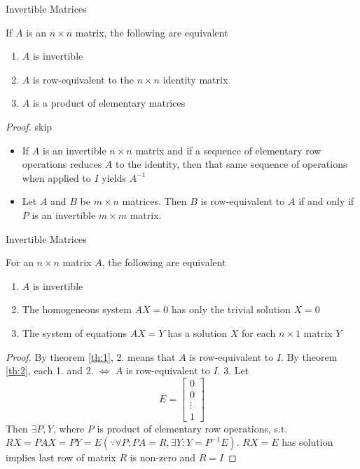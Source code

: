 \documentclass[8pt]{beamer}
\newcommand{\ti}[1]{\textit{#1}}
\begin{document}
\begin{frame}{Invertible Matrices}
  \begin{theorem}\label{th:2}
    If $A$ is an $n \times n$ matrix, the following are equivalent
    \begin{enumerate}
      \item $A$ is invertible
      \item $A$ is row-equivalent to the $n \times n$ identity matrix
      \item $A$ is a product of elementary matrices
    \end{enumerate}
  \end{theorem}
  \ti{Proof.} skip

  \begin{corollary}
    \begin{itemize}
      \item If $A$ is an invertible $n\times n$ matrix and if a sequence of elementary row operations reduces $A$ to the identity, then that same sequence of operations when applied to $I$ yields $A^{-1}$
      \item Let $A$ and $B$ be $m \times n$ matrices. Then $B$ is row-equivalent to $A$ if and only if $P$ is an invertible $m \times m$ matrix.
    \end{itemize}
  \end{corollary}
\end{frame}


\begin{frame}{Invertible Matrices}
  \begin{theorem}
    For an $n \times n$ matrix $A$, the following are equivalent
    \begin{enumerate}
      \item $A$ is invertible
      \item The homogeneous system $AX=0$ has only the trivial solution $X=0$
      \item The system of equations $AX=Y$ has a solution $X$ for each $n\times 1$ matrix $Y$
    \end{enumerate}
  \end{theorem}
  \begin{proof}
    By theorem \ref{th:1}, 2. means that $A$ is row-equivalent to $I$. By theorem \ref{th:2}, each 1. and 2. $\iff$ $A$ is row-equivalent to $I$.
    3. Let 
    \[
    E = \left[\begin{matrix}
    0 \\ 0 \\ \vdots \\ 1
    \end{matrix}\right]
    \] Then $\exists P, Y$, where $P$ is product of elementary row operations, s.t. $RX = PAX = PY = E (\because \forall P : PA = R, \exists Y : Y = P^{-1}E)$. $RX = E$ has solution implies last row of matrix $R$ is non-zero and $R = I$
  \end{proof}
\end{frame}
\end{document}

